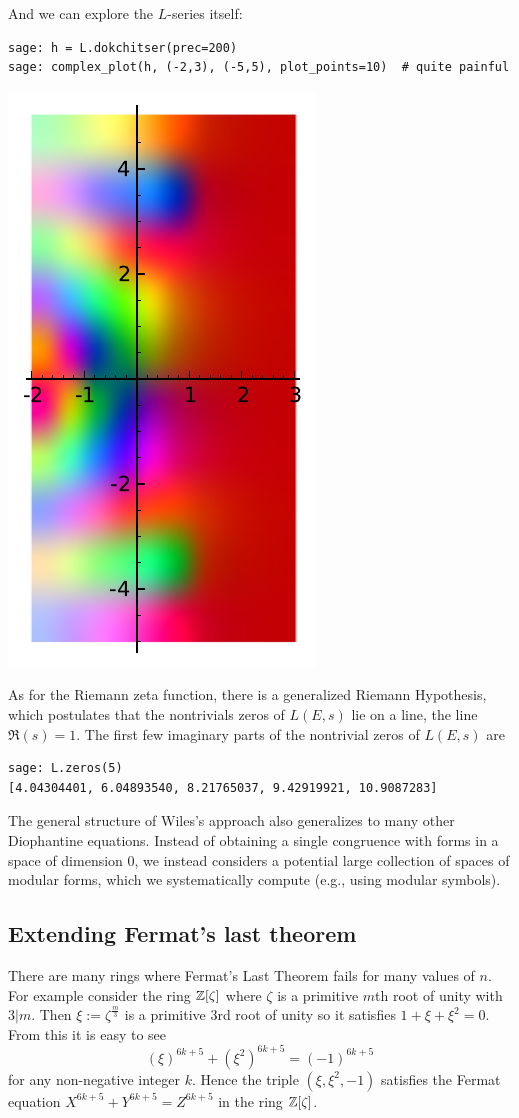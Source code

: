 \documentclass{book}
\begin{document}
And we can explore the $L$-series itself:

\begin{lstlisting}
sage: h = L.dokchitser(prec=200)
sage: complex_plot(h, (-2,3), (-5,5), plot_points=10)  # quite painful
\end{lstlisting}

\begin{center}
\includegraphics[width=.4\textwidth]{pics/27a-lser1.pdf}
\end{center}

As for the Riemann zeta function, there is a generalized Riemann
Hypothesis, which postulates that the nontrivials zeros of
$L(E,s)$ lie on a line, the line $\Re(s)=1$.
The first few imaginary parts of the nontrivial zeros of $L(E,s)$ are
\begin{lstlisting}
sage: L.zeros(5)
[4.04304401, 6.04893540, 8.21765037, 9.42919921, 10.9087283]
\end{lstlisting}

The general structure of Wiles's approach also generalizes to many other
Diophantine equations.  Instead of obtaining a single congruence with
forms in a space of dimension 0, we instead considers a potential
large collection of spaces of modular forms, which we systematically
compute (e.g., using modular symbols).

\subsection{Extending Fermat's last theorem} %

There are many rings where Fermat's Last Theorem fails for many values of
$n$. For example consider the ring $\mathbb{Z}[\zeta]$ where $\zeta$ is a primitive
$m$th root of unity with $3 | m$. Then $\xi := \zeta^\frac{m}{3}$ is
a primitive $3$rd root of unity so it satisfies $1+\xi+\xi^2=0$.
From this it is easy to see
$$
(\xi)^{6k+5} + (\xi^2)^{6k+5} = (-1)^{6k+5}
$$
for any non-negative integer $k$. Hence the triple $(\xi,\xi^2,-1)$ satisfies
the Fermat equation $X^{6k+5}+Y^{6k+5}=Z^{6k+5}$ in the ring $\mathbb{Z}[\zeta]$. \\
\end{document}
